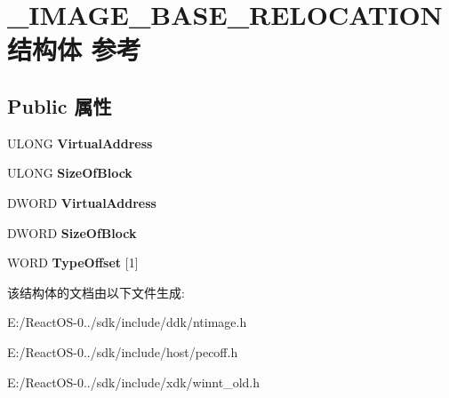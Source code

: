 \hypertarget{struct___i_m_a_g_e___b_a_s_e___r_e_l_o_c_a_t_i_o_n}{}\section{\+\_\+\+I\+M\+A\+G\+E\+\_\+\+B\+A\+S\+E\+\_\+\+R\+E\+L\+O\+C\+A\+T\+I\+O\+N结构体 参考}
\label{struct___i_m_a_g_e___b_a_s_e___r_e_l_o_c_a_t_i_o_n}
\subsection*{Public 属性}
\begin{DoxyCompactItemize}
\item 
\mbox{\label{struct___i_m_a_g_e___b_a_s_e___r_e_l_o_c_a_t_i_o_n_aa9cd235a62c0b36e0b9f7051be3c5dcb}} 
U\+L\+O\+NG {\bfseries Virtual\+Address}
\item 
\mbox{\label{struct___i_m_a_g_e___b_a_s_e___r_e_l_o_c_a_t_i_o_n_a81d20c4bdef7268e328159bbc56e2d76}} 
U\+L\+O\+NG {\bfseries Size\+Of\+Block}
\item 
\mbox{\label{struct___i_m_a_g_e___b_a_s_e___r_e_l_o_c_a_t_i_o_n_aa9cd235a62c0b36e0b9f7051be3c5dcb}} 
D\+W\+O\+RD {\bfseries Virtual\+Address}
\item 
\mbox{\label{struct___i_m_a_g_e___b_a_s_e___r_e_l_o_c_a_t_i_o_n_a81d20c4bdef7268e328159bbc56e2d76}} 
D\+W\+O\+RD {\bfseries Size\+Of\+Block}
\item 
\mbox{\label{struct___i_m_a_g_e___b_a_s_e___r_e_l_o_c_a_t_i_o_n_a18095667bf4ea98fd57ae729529d113b}} 
W\+O\+RD {\bfseries Type\+Offset} \mbox{[}1\mbox{]}
\end{DoxyCompactItemize}


该结构体的文档由以下文件生成\+:\begin{DoxyCompactItemize}
\item 
E\+:/\+React\+O\+S-\/0../sdk/include/ddk/ntimage.\+h\item 
E\+:/\+React\+O\+S-\/0../sdk/include/host/pecoff.\+h\item 
E\+:/\+React\+O\+S-\/0../sdk/include/xdk/winnt\+\_\+old.\+h\end{DoxyCompactItemize}
